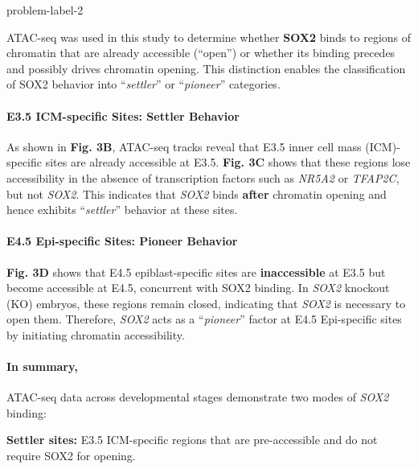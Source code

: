 \vspace{-2em}  %
\setlength{\columnsep}{0.5pt}
\begin{multicols}{2}

\begin{problem}{}{problem-label-2}

    ATAC-seq was used in this study to determine whether \textbf{SOX2} binds to regions of chromatin that are already accessible (``open'') or whether its binding precedes and possibly drives chromatin opening. This distinction enables the classification of SOX2 behavior into ``\textit{settler}'' or ``\textit{pioneer}'' categories.

    \paragraph{E3.5 ICM-specific Sites: Settler Behavior}
    
    As shown in \textbf{Fig. 3B}, ATAC-seq tracks reveal that E3.5 inner cell mass (ICM)-specific sites are already accessible at E3.5.
    \textbf{Fig. 3C} shows that these regions lose accessibility in the absence of transcription factors such as \textit{NR5A2} or \textit{TFAP2C}, but not \textit{SOX2}.
    This indicates that \textit{SOX2} binds \textbf{after} chromatin opening and hence exhibits ``\textit{settler}'' behavior at these sites.
    
    \paragraph{E4.5 Epi-specific Sites: Pioneer Behavior}
    
    \textbf{Fig. 3D} shows that E4.5 epiblast-specific sites are \textbf{inaccessible} at E3.5 but become accessible at E4.5, concurrent with SOX2 binding.
    In \textit{SOX2} knockout (KO) embryos, these regions remain closed, indicating that \textit{SOX2} is necessary to open them.
    Therefore, \textit{SOX2} acts as a ``\textit{pioneer}'' factor at E4.5 Epi-specific sites by initiating chromatin accessibility.
    
    \paragraph{In summary,}
    
    ATAC-seq data across developmental stages demonstrate two modes of \textit{SOX2} binding:
    
    \textbf{Settler sites:} E3.5 ICM-specific regions that are pre-accessible and do not require SOX2 for opening.
    

\end{problem}
\end{multicols}
